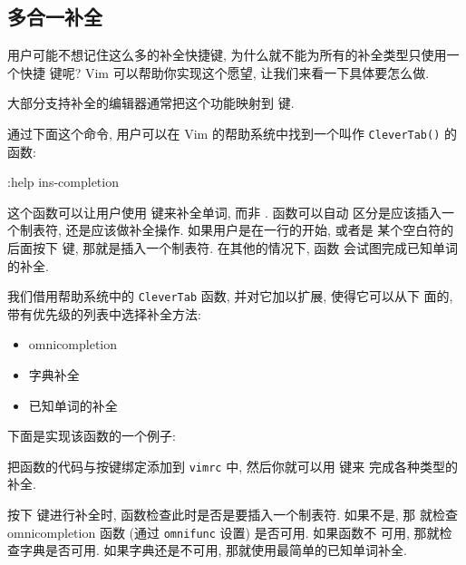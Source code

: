 \subsection{多合一补全}
\label{subsec:all_in_one_completion}

用户可能不想记住这么多的补全快捷键, 为什么就不能为所有的补全类型只使用一个快捷
键呢? Vim 可以帮助你实现这个愿望, 让我们来看一下具体要怎么做.

大部分支持补全的编辑器通常把这个功能映射到  键.

通过下面这个命令, 用户可以在 Vim 的帮助系统中找到一个叫作
\texttt{CleverTab()} 的函数:
\begin{vimcode}
:help ins-completion
\end{vimcode}
这个函数可以让用户使用  键来补全单词, 而非 . 函数可以自动
区分是应该插入一个制表符, 还是应该做补全操作. 如果用户是在一行的开始, 或者是 
某个空白符的后面按下  键, 那就是插入一个制表符. 在其他的情况下, 函数 
会试图完成已知单词的补全.

我们借用帮助系统中的 \texttt{CleverTab} 函数, 并对它加以扩展, 使得它可以从下
面的, 带有优先级的列表中选择补全方法:
\begin{itemize}
    \item omnicompletion
    \item 字典补全
    \item 已知单词的补全
\end{itemize}
下面是实现该函数的一个例子:

把函数的代码与按键绑定添加到 \texttt{vimrc} 中, 然后你就可以用  键来 
完成各种类型的补全.

按下  键进行补全时, 函数检查此时是否是要插入一个制表符. 如果不是, 那
就检查 omnicompletion 函数 (通过 \texttt{omnifunc} 设置) 是否可用. 如果函数不
可用, 那就检查字典是否可用. 如果字典还是不可用, 那就使用最简单的已知单词补全.

